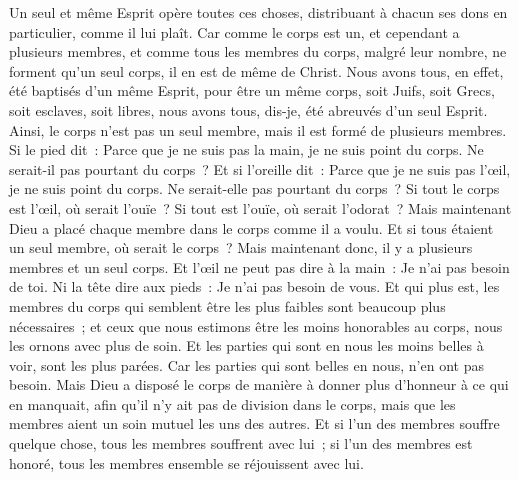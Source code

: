 \begin{multicols}{2}
Un seul et même Esprit opère toutes ces choses, distribuant à chacun ses dons en particulier, comme il lui plaît.
Car comme le corps est un, et cependant a plusieurs membres, et comme tous les membres du corps, malgré leur nombre, ne forment qu'un seul corps, il en est de même de Christ.
Nous avons tous, en effet, été baptisés d'un même Esprit, pour être un même corps, soit Juifs, soit Grecs, soit esclaves, soit libres, nous avons tous, dis-je, été abreuvés d'un seul Esprit.
Ainsi, le corps n'est pas un seul membre, mais il est formé de plusieurs membres.
Si le pied dit~: Parce que je ne suis pas la main, je ne suis point du corps. Ne serait-il pas pourtant du corps~?
Et si l'oreille dit~: Parce que je ne suis pas l'œil, je ne suis point du corps. Ne serait-elle pas pourtant du corps~?
Si tout le corps est l'œil, où serait l'ouïe~? Si tout est l'ouïe, où serait l'odorat~?
Mais maintenant Dieu a placé chaque membre dans le corps comme il a voulu.
Et si tous étaient un seul membre, où serait le corps~?
Mais maintenant donc, il y a plusieurs membres et un seul corps.
Et l'œil ne peut pas dire à la main~: Je n'ai pas besoin de toi. Ni la tête dire aux pieds~: Je n'ai pas besoin de vous.
Et qui plus est, les membres du corps qui semblent être les plus faibles sont beaucoup plus nécessaires~;
et ceux que nous estimons être les moins honorables au corps, nous les ornons avec plus de soin. Et les parties qui sont en nous les moins belles à voir, sont les plus parées. 
Car les parties qui sont belles en nous, n'en ont pas besoin. Mais Dieu a disposé le corps de manière à donner plus d'honneur à ce qui en manquait,
afin qu'il n'y ait pas de division dans le corps, mais que les membres aient un soin mutuel les uns des autres.
Et si l'un des membres souffre quelque chose, tous les membres souffrent avec lui~; si l'un des membres est honoré, tous les membres ensemble se réjouissent avec lui.

\end{multicols}
